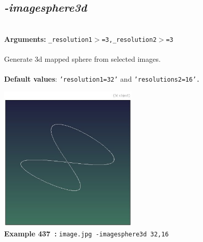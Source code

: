 \documentclass[a4paper,11pt,twoside]{book}
\begin{document}
\subsection{\emph{-imagesphere3d} }\vspace*{-0.5em}
~\\\textbf{Arguments: } 
{\small \texttt{\_resolution1$>$=3,\_resolution2$>$=3}}\\~\\
Generate 3d mapped sphere from selected images.
~\\~\\\textbf{Default values}: {\small \texttt{'resolution1=32'} and \texttt{'resolutions2=16'.}}
\begin{center}\includegraphics[keepaspectratio=true,height=7cm,width=\textwidth]{img/gmic_def437.jpg}\\
{\footnotesize \textbf{Example 437~:} \texttt{image.jpg -imagesphere3d 32,16}}
\end{center}
\end{document}
